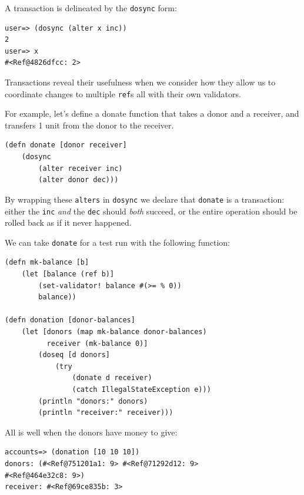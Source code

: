\documentclass[a4paper,12pt]{kth-mag}
\begin{document}
A transaction is delineated by the \texttt{dosync} form:

\begin{listing}[H]
	\begin{verbatim}
user=> (dosync (alter x inc))
2
user=> x
#<Ref@4826dfcc: 2>
	\end{verbatim}
\end{listing}

Transactions reveal their usefulness when we consider how they allow us to coordinate changes to multiple \texttt{ref}s all with their own validators.

For example, let's define a donate function that takes a donor and a receiver, and transfers 1 unit from the donor to the receiver.

\begin{listing}[H]
	\begin{verbatim}
(defn donate [donor receiver]
    (dosync 
        (alter receiver inc)
        (alter donor dec)))
	\end{verbatim}
\end{listing}

By wrapping these \texttt{alters} in \texttt{dosync} we declare that \texttt{donate} is a transaction: either the \texttt{inc} \textit{and} the \texttt{dec} should \textit{both} succeed, or the entire operation should be rolled back as if it never happened. 

We can take \texttt{donate} for a test run with the following function:

\begin{listing}[H]
	\begin{verbatim}
(defn mk-balance [b]
    (let [balance (ref b)]
        (set-validator! balance #(>= % 0))
        balance))

(defn donation [donor-balances]
    (let [donors (map mk-balance donor-balances)
          receiver (mk-balance 0)]
        (doseq [d donors]  
            (try 
                (donate d receiver)
                (catch IllegalStateException e)))
        (println "donors:" donors)
        (println "receiver:" receiver)))
	\end{verbatim}
\end{listing}

All is well when the donors have money to give:

\begin{listing}[H]
	\begin{verbatim}
accounts=> (donation [10 10 10])
donors: (#<Ref@751201a1: 9> #<Ref@71292d12: 9> 
#<Ref@464e32c8: 9>)
receiver: #<Ref@69ce835b: 3>
	\end{verbatim}
\end{listing}
\end{document}
